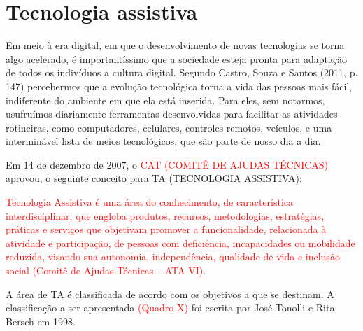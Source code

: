 \documentclass[
	12pt,			%
	openright,		%
	oneside,			%
	a4paper,			%
	chapter=TITLE,		%
	english,			%
	brazil,			%
	]{abntex2}
\begin{document}
\section{Tecnologia assistiva}

Em meio à era digital, em que o desenvolvimento de novas tecnologias se torna algo acelerado, é importantíssimo que a sociedade esteja pronta para adaptação de todos os indivíduos a cultura digital. Segundo Castro, Souza e Santos (2011, p. 147) percebermos que a evolução tecnológica torna a vida das pessoas mais fácil, indiferente do ambiente em que ela está inserida. Para eles, sem notarmos, usufruímos diariamente ferramentas desenvolvidas para facilitar as atividades rotineiras, como computadores, celulares, controles remotos, veículos, e uma interminável lista de meios tecnológicos, que são parte de nosso dia a dia.

Em 14 de dezembro de 2007, o \textcolor{red}{CAT (COMITÊ DE AJUDAS TÉCNICAS)} aprovou, o seguinte conceito para TA (TECNOLOGIA ASSISTIVA):

\textcolor{red}{Tecnologia Assistiva é uma área do conhecimento, de característica interdisciplinar, que engloba produtos, recursos, metodologias, estratégias, práticas e serviços que objetivam promover a funcionalidade, relacionada à atividade e participação, de pessoas com deficiência, incapacidades ou mobilidade reduzida, visando sua autonomia, independência, qualidade de vida e inclusão social} \textcolor{red}{(Comitê de Ajudas Técnicas – ATA VI)}. 

A área de TA é classificada de acordo com os objetivos a que se destinam. A classificação a ser apresentada \textcolor{red}{(Quadro X)} foi escrita por José Tonolli e Rita Bersch em 1998.
\end{document}
